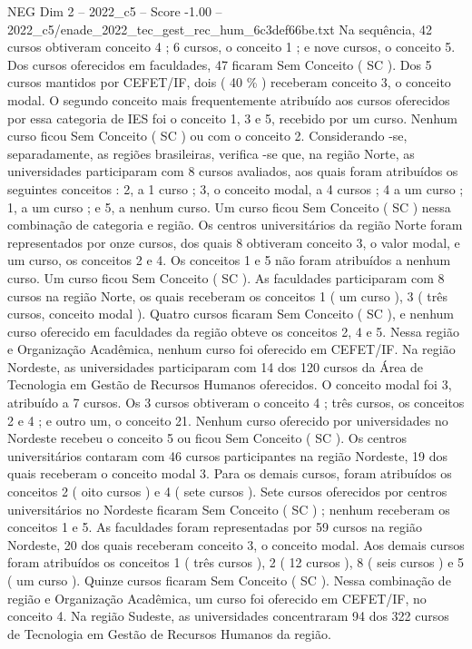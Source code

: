 \begin{textsample}{NEG Dim 2 – 2022\_c5 – Score -1.00 – 2022\_c5/enade\_2022\_tec\_gest\_rec\_hum\_6c3def66be.txt}
Na sequência, 42 cursos obtiveram conceito 4 ; 6 cursos, o conceito 1 ; e nove cursos, o conceito 5.
Dos cursos oferecidos em faculdades, 47 ficaram Sem Conceito ( SC ).
Dos 5 cursos mantidos por CEFET/IF, dois ( 40 \% ) receberam conceito 3, o conceito modal.
O segundo conceito mais frequentemente atribuído aos cursos oferecidos por essa categoria de IES foi o conceito 1, 3 e 5, recebido por um curso.
Nenhum curso ficou Sem Conceito ( SC ) ou com o conceito 2.
Considerando -se, separadamente, as regiões brasileiras, verifica -se que, na região Norte, as universidades participaram com 8 cursos avaliados, aos quais foram atribuídos os seguintes conceitos : 2, a 1 curso ; 3, o conceito modal, a 4 cursos ; 4 a um curso ; 1, a um curso ; e 5, a nenhum curso.
Um curso ficou Sem Conceito ( SC ) nessa combinação de categoria e região.
Os centros universitários da região Norte foram representados por onze cursos, dos quais 8 obtiveram conceito 3, o valor modal, e um curso, os conceitos 2 e 4.
Os conceitos 1 e 5 não foram atribuídos a nenhum curso.
Um curso ficou Sem Conceito ( SC ).
As faculdades participaram com 8 cursos na região Norte, os quais receberam os conceitos 1 ( um curso ), 3 ( três cursos, conceito modal ).
Quatro cursos ficaram Sem Conceito ( SC ), e nenhum curso oferecido em faculdades da região obteve os conceitos 2, 4 e 5.
Nessa região e Organização Acadêmica, nenhum curso foi oferecido em CEFET/IF.
Na região Nordeste, as universidades participaram com 14 dos 120 cursos da Área de Tecnologia em Gestão de Recursos Humanos oferecidos.
O conceito modal foi 3, atribuído a 7 cursos.
Os 3 cursos obtiveram o conceito 4 ; três cursos, os conceitos 2 e 4 ; e outro um, o conceito 21.
Nenhum curso oferecido por universidades no Nordeste recebeu o conceito 5 ou ficou Sem Conceito ( SC ).
Os centros universitários contaram com 46 cursos participantes na região Nordeste, 19 dos quais receberam o conceito modal 3.
Para os demais cursos, foram atribuídos os conceitos 2 ( oito cursos ) e 4 ( sete cursos ).
Sete cursos oferecidos por centros universitários no Nordeste ficaram Sem Conceito ( SC ) ; nenhum receberam os conceitos 1 e 5.
As faculdades foram representadas por 59 cursos na região Nordeste, 20 dos quais receberam conceito 3, o conceito modal.
Aos demais cursos foram atribuídos os conceitos 1 ( três cursos ), 2 ( 12 cursos ), 8 ( seis cursos ) e 5 ( um curso ).
Quinze cursos ficaram Sem Conceito ( SC ).
Nessa combinação de região e Organização Acadêmica, um curso foi oferecido em CEFET/IF, no conceito 4.
Na região Sudeste, as universidades concentraram 94 dos 322 cursos de Tecnologia em Gestão de Recursos Humanos da região.

\end{textsample}
